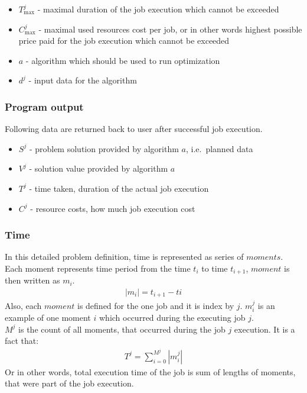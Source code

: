 \begin{itemize}
	\item $T_{\max}^{j}$ - maximal duration of the job execution which cannot be exceeded
	\item $C_{\max}^{j}$ - maximal used resources cost per job, or in other words highest possible price paid for the job execution which cannot be exceeded
	\item $a$ - algorithm which should be used to run optimization
	\item $d^{j}$ - input data for the algorithm
\end{itemize}

\subsubsection{Program output}
Following data are returned back to user after successful job execution.
 
\begin{itemize}
	\item $S^{j}$ - problem solution provided by algorithm $a$, i.e.\ planned data
	\item $V^{j}$ - solution value provided by algorithm $a$
	\item $T^{j}$ - time taken, duration of the actual job execution
	\item $C^{j}$ - resource costs, how much job execution cost
\end{itemize}

\subsubsection{Time}
In this detailed problem definition, 
time is represented as series of $moments$.
Each moment represents time period from the time $t_i$ to time $t_{i+1}$,
$moment$ is then written as $m_i$.
\begin{align*}
	|m_{i}| = t_{i+1} - t{i} 
\end{align*}
Also, each $moment$ is defined for the one job and it is index by $j$.
$m_{i}^{j}$ is an example of one moment $i$ which occurred during the executing job $j$.\\
$M^{j}$ is the count of all moments, that occurred during the job $j$ execution.
It is a fact that:
\begin{align*}
	T^{j} = \sum_{i = 0}^{M^{j}} | m_{i}^{j} | 
\end{align*}
Or in other words, total execution time of the job is sum of lengths of moments, that were part of the job execution.

